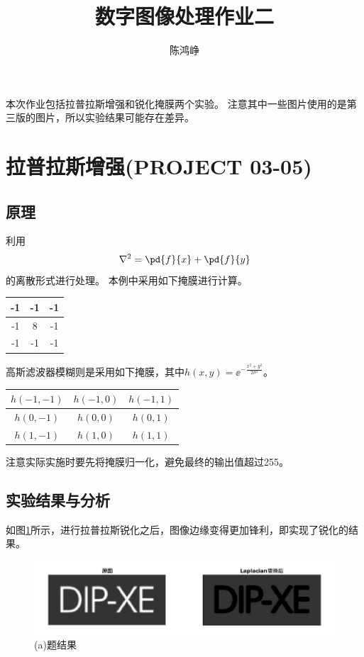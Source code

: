 \documentclass[logo,reportComp]{thesis}
\title{数字图像处理作业二}
\subtitle{}
\author{陈鸿峥}
\begin{document}
\maketitle
本次作业包括拉普拉斯增强和锐化掩膜两个实验。
注意其中一些图片使用的是第三版的图片，所以实验结果可能存在差异。

\section{拉普拉斯增强(PROJECT 03-05)}
\subsection{原理}
利用
\[\nabla^2=\pd{f}{x}+\pd{f}{y}\]
的离散形式进行处理。
本例中采用如下掩膜进行计算。
\begin{center}
\begin{tabular}{|c|c|c|}\hline
-1 & -1 & -1\\\hline
-1 & 8 & -1 \\\hline
-1 & -1 & -1\\\hline
\end{tabular}
\end{center}

高斯滤波器模糊则是采用如下掩膜，其中$h(x,y)=\ee^{-\frac{x^2+y^2}{2\sigma^2}}$。
\begin{center}
\begin{tabular}{|c|c|c|}\hline
$h(-1,-1)$ & $h(-1,0)$ & $h(-1,1)$\\\hline
$h(0,-1)$ & $h(0,0)$ & $h(0,1)$ \\\hline
$h(1,-1)$ & $h(1,0)$ & $h(1,1)$\\\hline
\end{tabular}
\end{center}
注意实际实施时要先将掩膜归一化，避免最终的输出值超过255。

\subsection{实验结果与分析}
如图\ref{fig:a}所示，进行拉普拉斯锐化之后，图像边缘变得更加锋利，即实现了锐化的结果。
\begin{figure}[H]
\centering
\includegraphics[width=0.8\linewidth]{a.jpg}
\caption{(a)题结果}
\label{fig:a}
\end{figure}
\end{document}
